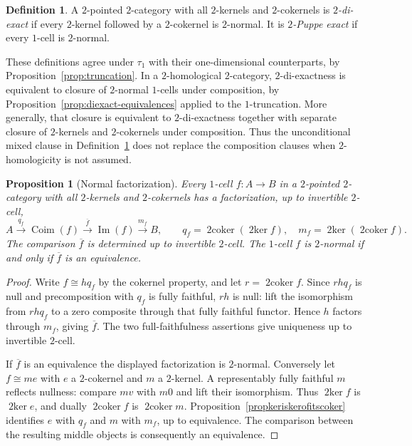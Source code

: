 \documentclass[11pt,reqno,a4paper]{amsart}
\newtheorem{proposition}[theorem]{Proposition}
\theoremstyle{definition}
\newtheorem{definition}[theorem]{Definition}
\theoremstyle{remark}
\newcommand{\0}{\mathbf{0}}
\renewcommand{\1}{\mathbf{1}}
\newcommand{\twoker}{\operatorname{2ker}}
\newcommand{\twocoker}{\operatorname{2coker}}
\begin{document}
\begin{definition}\label{def:2-diexact}
A $2$-pointed $2$-category with all $2$-kernels and
$2$-cokernels is \emph{$2$-di-exact} if every $2$-kernel
followed by a $2$-cokernel is $2$-normal. It is
\emph{$2$-Puppe exact} if every $1$-cell is $2$-normal.
\end{definition}

These definitions agree under $\tau_1$ with their one-dimensional
counterparts, by Proposition~\ref{prop:truncation}. In a
$2$-homological $2$-category, $2$-di-exactness is equivalent to
closure of $2$-normal $1$-cells under composition, by
Proposition~\ref{prop:diexact-equivalences} applied to the
$1$-truncation. More generally, that closure is equivalent to
$2$-di-exactness together with separate closure of $2$-kernels
and $2$-cokernels under composition. Thus the unconditional mixed
clause in Definition~\ref{def:2-diexact} does not replace the
composition clauses when $2$-homologicity is not assumed.

\begin{proposition}[Normal factorization]\label{prop:normal-factor}
Every $1$-cell $f:A\to B$ in a $2$-pointed $2$-category with all
$2$-kernels and $2$-cokernels has a factorization, up to invertible
$2$-cell,
\[
 A\xrightarrow{q_f}\operatorname{Coim}(f)
 \xrightarrow{\overline f}\operatorname{Im}(f)
 \xrightarrow{m_f}B,
 \qquad q_f=\twocoker(\twoker f),\quad
 m_f=\twoker(\twocoker f).
\]
The comparison $\overline f$ is determined up to invertible $2$-cell.
The $1$-cell $f$ is $2$-normal if and only if $\overline f$ is an equivalence.
\end{proposition}
\begin{proof}
Write $f\cong hq_f$ by the cokernel property, and let $r=\twocoker f$.
Since $rhq_f$ is null and precomposition with $q_f$ is fully faithful,
$rh$ is null: lift the isomorphism from $rhq_f$ to a zero composite
through that fully faithful functor. Hence $h$ factors through $m_f$,
giving $\overline f$. The two full-faithfulness assertions give uniqueness
up to invertible $2$-cell.

If $\overline f$ is an equivalence the displayed factorization is
$2$-normal. Conversely let $f\cong me$ with $e$ a $2$-cokernel and $m$
a $2$-kernel. A representably fully faithful $m$ reflects nullness:
compare $mv$ with $m0$ and lift their isomorphism. Thus $\twoker f$
is $\twoker e$, and dually $\twocoker f$ is $\twocoker m$.
Proposition~\ref{propkeriskerofitscoker} identifies $e$ with $q_f$ and
$m$ with $m_f$, up to equivalence. The comparison between the resulting
middle objects is consequently an equivalence.
\end{proof}
\end{document}
